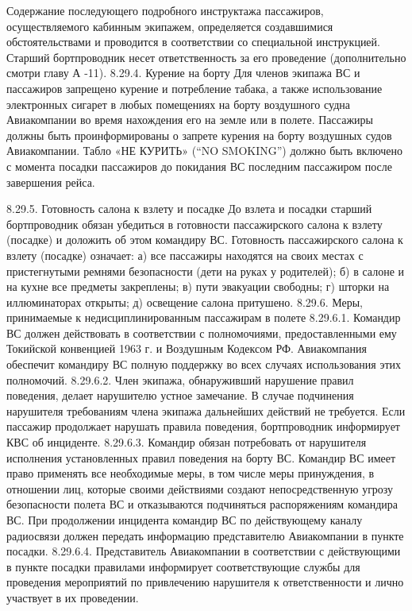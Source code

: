 Содержание последующего подробного инструктажа пассажиров, осуществляемого кабинным экипажем, определяется создавшимися обстоятельствами и проводится в соответствии со специальной инструкцией.
Старший бортпроводник несет ответственность за его проведение (дополнительно смотри главу А -11).
8.29.4.	Курение на борту
Для членов экипажа ВС и пассажиров запрещено курение и потребление табака, а также использование электронных сигарет в любых помещениях на борту воздушного судна Авиакомпании во время нахождения его на земле или в полете.
Пассажиры должны быть проинформированы о запрете курения на борту воздушных судов Авиакомпании.
Табло «НЕ КУРИТЬ» (“NO SMOKING”) должно быть включено с момента посадки пассажиров до покидания ВС последним пассажиром после завершения рейса.



8.29.5.	Готовность салона к взлету и посадке 
До взлета и посадки старший бортпроводник обязан убедиться в готовности пассажирского салона к взлету (посадке) и доложить об этом командиру ВС.
Готовность пассажирского салона к взлету (посадке) означает:
а)	все пассажиры находятся на своих местах с пристегнутыми ремнями безопасности (дети на руках у родителей);
б)	в салоне и на кухне все предметы закреплены;
в)	пути эвакуации свободны;
г)	шторки на иллюминаторах открыты;
д)	освещение салона притушено.
8.29.6.	Меры, принимаемые к недисциплинированным пассажирам в полете
8.29.6.1. Командир ВС должен действовать в соответствии с полномочиями, предоставленными ему Токийской конвенцией 1963 г. и Воздушным Кодексом РФ.
Авиакомпания обеспечит командиру ВС полную поддержку во всех случаях использования этих полномочий.
8.29.6.2. Член экипажа, обнаруживший нарушение правил поведения, делает нарушителю устное замечание.
В случае подчинения нарушителя требованиям члена экипажа дальнейших действий не требуется.
Если пассажир продолжает нарушать правила поведения, бортпроводник информирует КВС об инциденте.
8.29.6.3. Командир обязан потребовать от нарушителя исполнения установленных правил поведения на борту ВС.
Командир ВС имеет право применять все необходимые меры, в том числе меры принуждения, в отношении лиц, которые своими действиями создают непосредственную угрозу безопасности полета ВС и отказываются подчиняться распоряжениям командира ВС.
При продолжении инцидента командир ВС по действующему каналу радиосвязи должен передать информацию представителю Авиакомпании в пункте посадки.
8.29.6.4. Представитель Авиакомпании в соответствии с действующими в пункте посадки правилами информирует соответствующие службы для проведения мероприятий по привлечению нарушителя к ответственности и лично участвует в их проведении.
